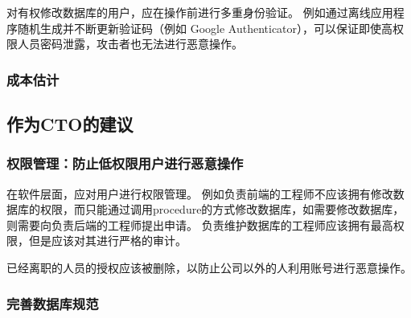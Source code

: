 \documentclass[a4paper,12pt]{ctexart}
\begin{document}
对有权修改数据库的用户，应在操作前进行多重身份验证。
例如通过离线应用程序随机生成并不断更新验证码（例如 Google Authenticator），可以保证即使高权限人员密码泄露，攻击者也无法进行恶意操作。

\subsubsection*{成本估计}

\begin{center}
\end{center}

\newpage

\subsection*{作为CTO的建议}

\subsubsection*{权限管理：防止低权限用户进行恶意操作}

在软件层面，应对用户进行权限管理。
例如负责前端的工程师不应该拥有修改数据库的权限，而只能通过调用procedure的方式修改数据库，如需要修改数据库，则需要向负责后端的工程师提出申请。
负责维护数据库的工程师应该拥有最高权限，但是应该对其进行严格的审计。

已经离职的人员的授权应该被删除，以防止公司以外的人利用账号进行恶意操作。

\subsubsection*{完善数据库规范}
\end{document}
